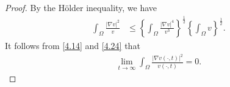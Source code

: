 \documentclass[10pt,a4paper]{amsart}
\begin{document}
\begin{proof}[Proof] By the H\"{o}lder inequality, we have
\begin{equation*}
\begin{split}
\int_\Omega \frac {|\nabla v|^2}v
&\leq
  \left\{ \int_\Omega\frac {|\nabla v|^4}{v^3}\right\}^{\frac 12}
\left\{\int_\Omega  v \right\} ^{\frac 12}.
\end{split}
\end{equation*}
 It follows from \eqref{4.14} and \eqref{4.24} that
\begin{equation}\label{4.31}
\begin{split}
\displaystyle\lim_{t\rightarrow \infty}
\int_\Omega \frac {|\nabla v(\cdot,t)|^2}{v(\cdot,t)} =0.
\end{split}
\end{equation}


\end{proof}
\end{document}
